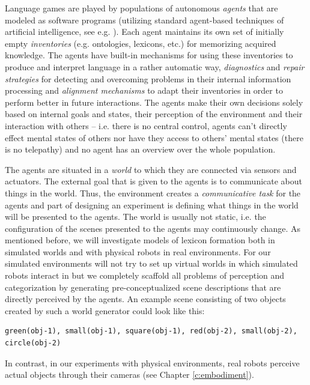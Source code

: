 Language games are played by populations of autonomous \emph{agents}
that are modeled as software programs (utilizing standard agent-based
techniques of artificial intelligence, see
e.g. \citealp{wooldridge95intelligent,russel95artificial}). Each agent
maintains its own set of initially empty \emph{inventories}
(e.g. ontologies, lexicons, etc.) for memorizing acquired
knowledge. The agents have built-in mechanisms for using these
inventories to produce and interpret language in a rather automatic
way, \emph{diagnostics} and \emph{repair strategies} for detecting and
overcoming problems in their internal information processing and
\emph{alignment mechanisms} to adapt their inventories in order to
perform better in future interactions. The agents make their own
decisions solely based on internal goals and states, their perception
of the environment and their interaction with others -- i.e. there is
no central control, agents can't directly effect mental states of
others nor have they access to others' mental states (there is no
telepathy) and no agent has an overview over the whole population.

The agents are situated in a \emph{world} to which they are connected
via sensors and actuators. The external goal that is given to the
agents is to communicate about things in the world. Thus, the
environment creates a \emph{communicative task} for the agents and
part of designing an experiment is defining what things in the world
will be presented to the agents. The world is usually not static,
i.e. the configuration of the scenes presented to the agents may
continuously change. As mentioned before, we will investigate models
of lexicon formation both in simulated worlds and with physical robots
in real environments. For our simulated environments will not try to
set up virtual worlds in which simulated robots interact in but we
completely scaffold all problems of perception and categorization by
generating pre-conceptualized scene descriptions that are directly
perceived by the agents. An example scene consisting of two objects
created by such a world generator could look like this: 

\begin{verbatim}
green(obj-1), small(obj-1), square(obj-1), red(obj-2), small(obj-2), circle(obj-2)
\end{verbatim}
In contrast, in our experiments with physical environments, real
robots perceive actual objects through their cameras (see Chapter
\ref{c:embodiment}).


